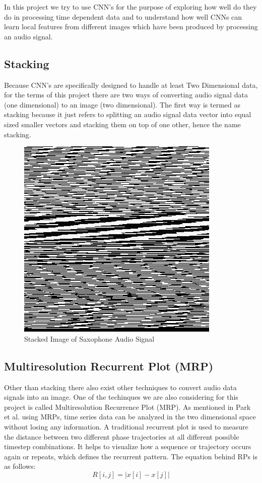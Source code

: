 \documentclass[letterpaper, 12 pt, conference]{ieeeconf}  %
\begin{document}
In this project we try to use CNN's for the purpose of exploring how well do they do in processing time dependent data and to understand how well CNNs can learn local features from different images which have been produced by processing an audio signal.

\subsection{Stacking}

Because CNN's are specifically designed to handle at least Two Dimensional data, for the terms of this project there are two ways of converting audio signal data (one dimensional) to an image (two dimensional). The first way is termed as stacking because it just refers to splitting an audio signal data vector into equal sized smaller vectors and stacking them on top of one other, hence the name stacking.

\begin{figure}[!h]
\centering
\includegraphics[scale=0.30]{../figs/stacking/sax.jpg}	
\caption{Stacked Image of Saxophone Audio Signal}
\label{fig:Sax_Stack} 
\end{figure}

\subsection{Multiresolution Recurrent Plot (MRP)}

Other than stacking there also exist other techniques to convert audio data signals into an image. One of the techinques we are also considering for this project is called Multiresolution Recurrence Plot (MRP). As mentioned in Park et al. \cite{cnn_music_mrp} using MRPs, time series data can be analyzed in the two dimensional space without losing any information. A traditional recurrent plot is used to measure the distance between two different phase trajectories at all different possible timestep combinations. It helps to visualize how a sequence or trajectory occurs again or repeats, which defines the recurrent pattern. The equation behind RPs is as follows:
\begin{equation}
R[i, j] = |{x[i] - x[j]}|
\end{equation}
\end{document}
